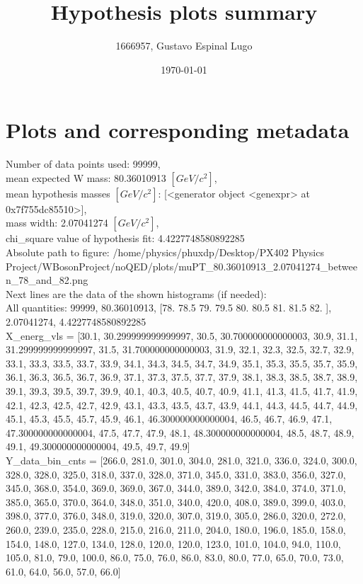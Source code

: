 \documentclass[12pt]{article}
\begin{document}
	\title{Hypothesis plots summary} %
	\author{1666957, Gustavo Espinal Lugo}
	\date{\today} %

	\maketitle
	
	\section*{Plots and corresponding metadata}
	Number of data points used: 99999,\\
mean expected W mass: 80.36010913 $[GeV/c^{2}]$,\\
mean hypothesis masses $[GeV/c^{2}]$: [<generator object <genexpr> at 0x7f755dc85510>],\\
mass width: 2.07041274 $[GeV/c^{2}]$,\\
chi\_square value of hypothesis fit: 4.4227748580892285\\
	Absolute path to figure: /home/physics/phuxdp/Desktop/PX402 Physics Project/WBosonProject/noQED/plots/muPT\_80.36010913\_2.07041274\_between\_78\_and\_82.png\\
	Next lines are the data of the shown histograms (if needed): \\
	All quantities: 	99999, 80.36010913, [78.  78.5 79.  79.5 80.  80.5 81.  81.5 82. ], 2.07041274, 4.4227748580892285\\
	X\_energ\_vls = [30.1, 30.299999999999997, 30.5, 30.700000000000003, 30.9, 31.1, 31.299999999999997, 31.5, 31.700000000000003, 31.9, 32.1, 32.3, 32.5, 32.7, 32.9, 33.1, 33.3, 33.5, 33.7, 33.9, 34.1, 34.3, 34.5, 34.7, 34.9, 35.1, 35.3, 35.5, 35.7, 35.9, 36.1, 36.3, 36.5, 36.7, 36.9, 37.1, 37.3, 37.5, 37.7, 37.9, 38.1, 38.3, 38.5, 38.7, 38.9, 39.1, 39.3, 39.5, 39.7, 39.9, 40.1, 40.3, 40.5, 40.7, 40.9, 41.1, 41.3, 41.5, 41.7, 41.9, 42.1, 42.3, 42.5, 42.7, 42.9, 43.1, 43.3, 43.5, 43.7, 43.9, 44.1, 44.3, 44.5, 44.7, 44.9, 45.1, 45.3, 45.5, 45.7, 45.9, 46.1, 46.300000000000004, 46.5, 46.7, 46.9, 47.1, 47.300000000000004, 47.5, 47.7, 47.9, 48.1, 48.300000000000004, 48.5, 48.7, 48.9, 49.1, 49.300000000000004, 49.5, 49.7, 49.9]\\
	Y\_data\_bin\_cnts = [266.0, 281.0, 301.0, 304.0, 281.0, 321.0, 336.0, 324.0, 300.0, 328.0, 328.0, 325.0, 318.0, 337.0, 328.0, 371.0, 345.0, 331.0, 383.0, 356.0, 327.0, 345.0, 368.0, 354.0, 369.0, 369.0, 367.0, 344.0, 389.0, 342.0, 384.0, 374.0, 371.0, 385.0, 365.0, 370.0, 364.0, 348.0, 351.0, 340.0, 420.0, 408.0, 389.0, 399.0, 403.0, 398.0, 377.0, 376.0, 348.0, 319.0, 320.0, 307.0, 319.0, 305.0, 286.0, 320.0, 272.0, 260.0, 239.0, 235.0, 228.0, 215.0, 216.0, 211.0, 204.0, 180.0, 196.0, 185.0, 158.0, 154.0, 148.0, 127.0, 134.0, 128.0, 120.0, 120.0, 123.0, 101.0, 104.0, 94.0, 110.0, 105.0, 81.0, 79.0, 100.0, 86.0, 75.0, 76.0, 86.0, 83.0, 80.0, 77.0, 65.0, 70.0, 73.0, 61.0, 64.0, 56.0, 57.0, 66.0]\\
\end{document}
